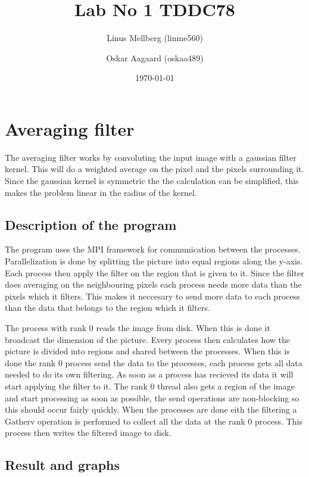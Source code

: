 \documentclass[a4paper,11pt]{article}
\begin{document}
\title{Lab No 1 TDDC78}
\author{Linus Mellberg (linme560) \and Oskar Aagaard (oskaa489)}
\date{\today}
\maketitle
\pagebreak
\thispagestyle{tcr}
\pagestyle{tcr}

\section{Averaging filter}
The averaging filter works by convoluting the input image with a gaussian filter kernel.
This will do a weighted average on the pixel and the pixels surrounding it.
Since the gaussian kernel is symmetric the the calculation can be simplified, this makes the problem linear in the radius of the kernel.
\subsection{Description of the program}
The program uses the MPI framework for communication between the processes.
Parallelization is done by splitting the picture into equal regions along the y-axis.
Each process then apply the filter on the region that is given to it. 
Since the filter does averaging on the neighbouring pixels each process needs more data than the pixels which it filters.
This makes it neccesary to send more data to each process than the data that belongs to the region which it filters.

The process with rank 0 reads the image from disk.
When this is done it broadcast the dimension of the picture.
Every process then calculates how the picture is divided into regions and shared between the processes.
When this is done the rank 0 process send the data to the processes, each process gets all data needed to do its own filtering.
As soon as a process has recieved its data it will start applying the filter to it.
The rank 0 thread also gets a region of the image and start processing as soon as possible, the send operations are non-blocking so this should occur fairly quickly.
When the processes are done eith the filtering a Gatherv operation is performed to collect all the data at the rank 0 process.
This process then writes the filtered image to disk.

\subsection{Result and graphs}
\end{document}

